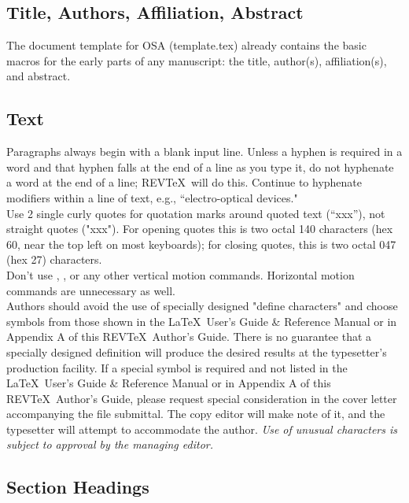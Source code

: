 \subsection{  Title, Authors, Affiliation, Abstract}

     The document template for OSA (template.tex) already
contains the basic macros for the early parts of any manuscript:
the title, author(s), affiliation(s), and abstract.

\subsection{  Text}

     Paragraphs always begin with a blank input line.  Unless a
hyphen is required in a word and that hyphen falls at the end of
a line as you type it, do not hyphenate a word at the end of a
line; REV\TeX\ will do this.  Continue to hyphenate modifiers
within a line of text, e.g., ``electro-optical devices."\\

     Use 2 single curly quotes for quotation marks around quoted
text (``xxx''), not straight quotes ("xxx").  For opening quotes
this is two octal 140 characters (hex 60, near the top left on
most keyboards); for closing quotes, this is two octal 047 (hex
27) characters.  \\

Don't use , , or any other vertical motion
commands.  Horizontal motion commands are unnecessary as well. \\

     Authors should avoid the use of specially designed "define
characters" and choose symbols from those shown in the \LaTeX\
User's Guide \& Reference Manual or in Appendix A of this REV\TeX\
Author's Guide.  There is no guarantee that a specially designed
definition will produce the desired results at the typesetter's
production facility.
     If a special symbol is required and not listed in the \LaTeX\
User's Guide \& Reference Manual or in Appendix A of this REV\TeX\
Author's Guide, please request special consideration in the cover
letter accompanying the file submittal.  The copy editor will
make note of it, and the typesetter will attempt to accommodate
the author.  {\it  Use of unusual characters is subject to
approval by the managing editor. }


\subsection{  Section Headings }

